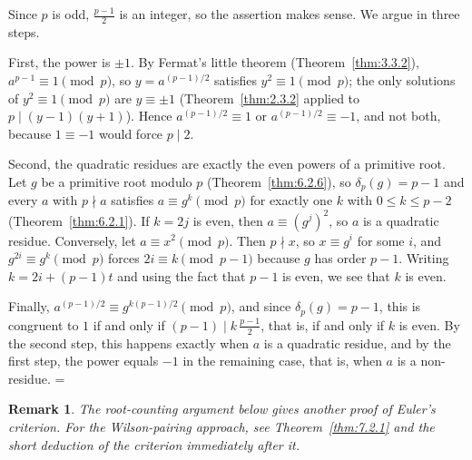 \documentclass[11pt]{article}
\makeatletter
\let\nt@closedisplay\]
\def\nt@guardedclose{\@ifnextchar\par{\nt@closeafterpar}{\@ifnextchar\end{\postdisplaypenalty\@M\nt@closedisplay}{\nt@closedisplay}}}
\def\nt@closeafterpar\par{\@ifnextchar\par{\nt@closeafterpar}{\@ifnextchar\end{\postdisplaypenalty\@M\nt@closedisplay\par}{\nt@closedisplay\par}}}
\renewenvironment{proof}[1][\proofname]{\par
  \pushQED{\qed}\normalfont\topsep\medskipamount\edef\nt@afterproof{\@endparpenalty=\the\@endparpenalty\relax}\@beginparpenalty\@M\@endparpenalty\@M\let\]\nt@guardedclose\trivlist\item[]\textit{#1\@addpunct{.}} \ignorespaces}{\ifvmode\addpenalty\@M\fi\popQED\nt@afterproof\endtrivlist\@endpefalse}
\theoremstyle{ntstyle}
\newtheorem*{remark}{Remark}
\makeatother
\begin{document}
\begin{proof} Since $p$ is odd, $\tfrac{p-1}{2}$ is an
  integer, so the assertion makes sense. We argue in three steps.

  First, the power is $\pm 1$. By Fermat's little theorem (Theorem~\ref{thm:3.3.2}), $a^{p-1} \equiv 1 \pmod{p}$,
  so $y = a^{(p-1)/2}$ satisfies $y^{2} \equiv 1 \pmod{p}$; the only solutions of $y^{2} \equiv 1 \pmod{p}$ are
  $y \equiv \pm 1$ (Theorem~\ref{thm:2.3.2} applied to $p \mid (y-1)(y+1)$). Hence $a^{(p-1)/2} \equiv 1$ or
  $a^{(p-1)/2} \equiv -1$, and not both, because $1 \equiv -1$ would force $p \mid 2$.

  Second, the quadratic residues are exactly the even powers of a
  primitive root. Let $g$ be a primitive root modulo $p$ (Theorem~\ref{thm:6.2.6}), so
  $\delta_p(g) = p-1$ and every $a$ with $p \nmid a$ satisfies $a \equiv g^{k} \pmod{p}$ for exactly one $k$ with
  $0 \le k \le p-2$ (Theorem~\ref{thm:6.2.1}). If
  $k = 2j$ is even, then $a \equiv (g^{j})^{2}$, so $a$ is a quadratic
  residue. Conversely, let $a \equiv x^{2} \pmod{p}$. Then $p \nmid x$,
  so $x \equiv g^{i}$ for some $i$, and $g^{2i} \equiv g^{k} \pmod{p}$
  forces $2i \equiv k \pmod{p-1}$ because $g$ has order $p-1$. Writing
  $k = 2i + (p-1)t$ and using the fact that $p-1$ is even, we see that $k$ is
  even.

  Finally, $a^{(p-1)/2} \equiv g^{k(p-1)/2} \pmod{p}$, and since $\delta_p(g) = p-1$, this is congruent to $1$ if and
  only if $(p-1) \mid k\,\tfrac{p-1}{2}$, that is, if and only if $k$ is
  even. By the second step, this happens exactly when $a$ is a quadratic residue,
  and by the first step, the power equals $-1$ in the remaining case, that is,
  when $a$ is a non-residue.
\end{proof}

\begin{remark}
The root-counting argument below gives another proof of Euler's criterion.
For the Wilson-pairing approach, see Theorem~\ref{thm:7.2.1} and the
short deduction of the criterion immediately after it.
\end{remark}
\end{document}
